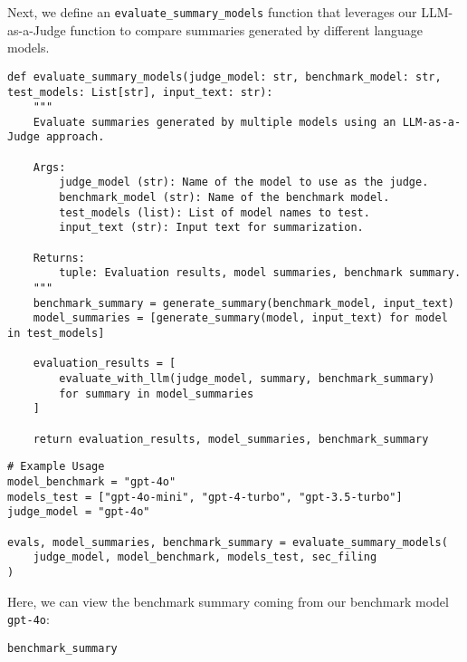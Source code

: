 Next, we define an \texttt{evaluate\_summary\_models} function that leverages our LLM-as-a-Judge function to compare summaries generated by different language models.~

\begin{verbatim}
def evaluate_summary_models(judge_model: str, benchmark_model: str, test_models: List[str], input_text: str):
    """
    Evaluate summaries generated by multiple models using an LLM-as-a-Judge approach.
    
    Args:
        judge_model (str): Name of the model to use as the judge.
        benchmark_model (str): Name of the benchmark model.
        test_models (list): List of model names to test.
        input_text (str): Input text for summarization.
    
    Returns:
        tuple: Evaluation results, model summaries, benchmark summary.
    """
    benchmark_summary = generate_summary(benchmark_model, input_text)
    model_summaries = [generate_summary(model, input_text) for model in test_models]

    evaluation_results = [
        evaluate_with_llm(judge_model, summary, benchmark_summary)
        for summary in model_summaries
    ]

    return evaluation_results, model_summaries, benchmark_summary
\end{verbatim}

\begin{verbatim}
# Example Usage
model_benchmark = "gpt-4o"
models_test = ["gpt-4o-mini", "gpt-4-turbo", "gpt-3.5-turbo"]
judge_model = "gpt-4o"

evals, model_summaries, benchmark_summary = evaluate_summary_models(
    judge_model, model_benchmark, models_test, sec_filing
)
\end{verbatim}

Here, we can view the benchmark summary coming from our benchmark model \texttt{gpt-4o}:

\begin{verbatim}
benchmark_summary
\end{verbatim}


